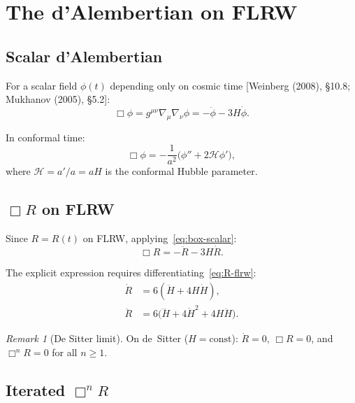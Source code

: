 \documentclass[12pt,a4paper]{article}
\theoremstyle{definition}
\theoremstyle{remark}
\newtheorem{remark}[proposition]{Remark}
\newcommand{\fromlit}[1]{\textcolor{blue!70!black}{\textsf{[#1]}}}
\begin{document}
\section{The d'Alembertian on FLRW}\label{sec:box-flrw}

\subsection{Scalar d'Alembertian}

For a scalar field $\phi(t)$ depending only on cosmic time
\fromlit{Weinberg (2008), \S10.8; Mukhanov (2005), \S5.2}:
\begin{equation}\label{eq:box-scalar}
  \Box\phi = g^{\mu\nu}\nabla_\mu\nabla_\nu\phi
  = -\ddot{\phi} - 3H\dot{\phi}.
\end{equation}

In conformal time:
\begin{equation}\label{eq:box-scalar-conformal}
  \Box\phi = -\frac{1}{a^2}\bigl(\phi'' + 2\mathcal{H}\phi'\bigr),
\end{equation}
where $\mathcal{H} = a'/a = aH$ is the conformal Hubble parameter.

\subsection{$\Box R$ on FLRW}\label{sec:box-R}

Since $R = R(t)$ on FLRW, applying~\eqref{eq:box-scalar}:
\begin{equation}\label{eq:boxR}
  \Box R = -\ddot{R} - 3H\dot{R}.
\end{equation}

The explicit expression requires differentiating~\eqref{eq:R-flrw}:
\begin{align}
  \dot{R} &= 6(\ddot{H} + 4H\dot{H}),
  \label{eq:Rdot}\\
  \ddot{R} &= 6\bigl(\dddot{H} + 4\dot{H}^2 + 4H\ddot{H}\bigr).
  \label{eq:Rddot}
\end{align}

\begin{remark}[De Sitter limit]
On de~Sitter ($H = \mathrm{const}$): $\dot{R} = 0$,
$\Box R = 0$, and $\Box^n R = 0$ for all $n \geq 1$.
\end{remark}

\subsection{Iterated $\Box^n R$}\label{sec:boxnR}
\end{document}
